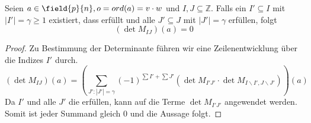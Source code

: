 {
\begin{satz}
    Seien $a \in \field{p}{n}, o = ord(a) = v\cdot w$ und $I,J \subseteq \mathbb{Z}$.
    Falls ein $I' \subseteq I$ mit $|I'| = \gamma \geq 1$ existiert, dass  erfüllt und alle $J' \subseteq J$ mit $|J'| = \gamma$  erfüllen, folgt
    \begin{equation*}
        (\det M_{IJ})(a) = 0
    \end{equation*}
\end{satz}

\begin{proof}
    Zu Bestimmung der Determinante führen wir eine Zeilenentwicklung über die Indizes $I'$ durch. 
\begin{equation*}
    (\det M_{IJ})(a) = \left( \sum_{J':|J'| = \gamma} (-1)^{\sum I' + \sum J'} \left( \det M_{I'J'} \cdot \det M_{I\backslash I',J\backslash J'} \right) \right)(a)
\end{equation*}
Da $I'$ und alle $J'$ die  erfüllen, kann  auf die Terme $\det M_{I'J'}$ angewendet werden. Somit ist jeder Summand gleich $0$ und die Aussage folgt.
\end{proof}

}